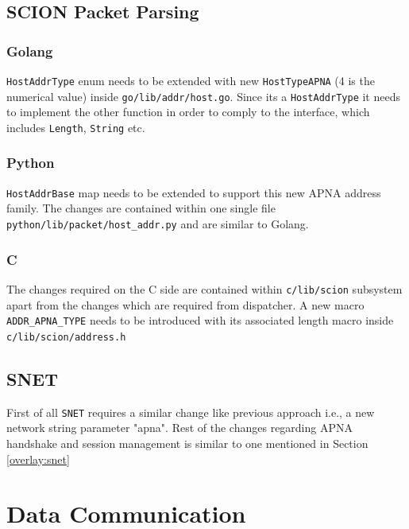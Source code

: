\subsection{SCION Packet Parsing}

\subsubsection{Golang}
\texttt{HostAddrType} enum needs to be extended with new \texttt{HostTypeAPNA} (4 is the numerical value) inside \texttt{go/lib/addr/host.go}. Since its a \texttt{HostAddrType} it needs to implement the other function in order to comply to the interface, which includes \texttt{Length}, \texttt{String} etc. 

\subsubsection{Python}
\texttt{HostAddrBase} map needs to be extended to support this new APNA address family. The changes are contained within one single file \texttt{python/lib/packet/host\_addr.py} and are similar to Golang.

\subsubsection{C}
The changes required on the C side are contained within \texttt{c/lib/scion} subsystem apart from the changes which are required from dispatcher. A new macro \texttt{ADDR\_APNA\_TYPE} needs to be introduced with its associated length macro inside \texttt{c/lib/scion/address.h}

\subsection{SNET}
First of all \texttt{SNET} requires a similar change like previous approach i.e., a new network string parameter "apna". Rest of the changes regarding APNA handshake and session management is similar to one mentioned in Section \ref{overlay:snet}

\section{Data Communication} \label{addr:data}

